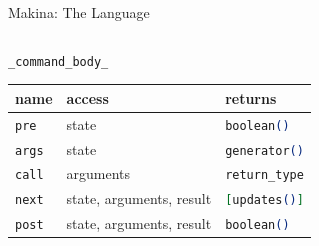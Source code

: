 \documentclass[aspectratio=169, 10pt, handout]{beamer}
\begin{document}
\begin{frame}[label={sec:orgba533c1},fragile]{Makina: The Language}
\begin{columns}
\begin{column}{0.58\columnwidth}
\vspace{10pt}
\lstinline[language=elixir, style=display]~_command_body_~
\begin{center}
\begin{tabular}{lll}
name & access & returns\\
\hline
\lstinline[language=elixir, style=display]~pre~ & state & \lstinline[language=elixir, style=display]~boolean()~\\
\lstinline[language=elixir, style=display]~args~ & state & \lstinline[language=elixir, style=display]~generator()~\\
\lstinline[language=elixir, style=display]~call~ & arguments & \lstinline[language=elixir, style=display]~return_type~\\
\lstinline[language=elixir, style=display]~next~ & state, arguments, result & \lstinline[language=elixir, style=display]~[updates()]~\\
\lstinline[language=elixir, style=display]~post~ & state, arguments, result & \lstinline[language=elixir, style=display]~boolean()~\\
\end{tabular}
\end{center}
\end{column}
\end{columns}
\end{frame}
\end{document}
